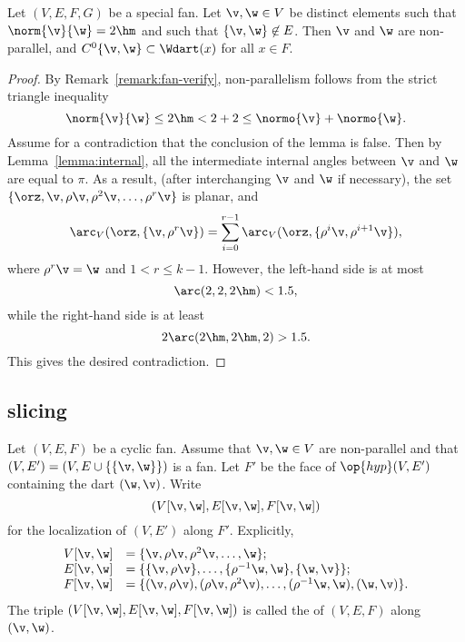 \begin{lemma}\label{lemma:2hm-slice}
Let $(V,E,F,G)$ be a special fan.  Let $\v,\w\in V$ be distinct
elements such that $\norm{\v}{\w}=2\hm$ and such that
$\{\v,\w\}\not\in E$.  Then $\v$ and $\w$ are non-parallel, and
$C^0\{\v,\w\}\subset \Wdart(x)$ for all $x\in F$.
\end{lemma}

\begin{proof} By Remark~\ref{remark:fan-verify}, non-parallelism follows
from the strict triangle inequality
\begin{displaymath}
\norm{\v}{\w} \le 2\hm < 2 + 2 \le \normo{\v} + \normo{\w}.
\end{displaymath}
Assume for a contradiction that the conclusion of the lemma is false.
Then by Lemma~\ref{lemma:internal}, all the intermediate internal
angles between $\v$ and $\w$ are equal to $\pi$.  As a result, (after
interchanging $\v$ and $\w$ if necessary), the set
$\{\orz,\v,\rho\v,\rho^2\v,\ldots,\rho^r\v\}$ is planar, and
\begin{displaymath}
  \arc_V(\orz,\{\v,\rho^r\v\}) 
= \sum_{i=0}^{r-1} \arc_V(\orz,\{\rho^i\v,\rho^{i+1}\v\}),
\end{displaymath}
where $\rho^r \v = \w$ and $1 < r \le k-1$.
However, the left-hand side is at most
\begin{displaymath}
\arc(2,2,2\hm) < 1.5,
\end{displaymath}
while the right-hand side is at least
\begin{displaymath}
2\arc(2\hm,2\hm,2) > 1.5.
\end{displaymath}
This gives the desired contradiction.
\end{proof}

\subsection{slicing}

\begin{definition}[slice] Let $(V,E,F)$ be a cyclic fan.  Assume that
$\v,\w\in V$ are non-parallel and that $(V,E')=(V,E\cup
\{\{\v,\w\}\})$ is a fan.  Let $F'$ be the face of $\op{hyp}(V,E')$
containing the dart $(\w,\v)$.  Write
\begin{displaymath}(V[\v,\w],E[\v,\w],F[\v,\w])\end{displaymath}
for the localization of $(V,E')$ along $F'$.  Explicitly,
\begin{displaymath}
\begin{array}{lll}
  V[\v,\w] &= \{\v,\rho \v,\rho^2 \v,\ldots,\w\};\\
  E[\v,\w] &= \{\{\v,\rho \v\},\ldots,\{\rho^{-1}\w,\w\},\{\w,\v\}\};\\
  F[\v,\w] &= \{(\v,\rho \v),(\rho \v,\rho^2 \v),
 \ldots,(\rho^{-1}\w,\w),(\w,\v)\}.
\end{array}
\end{displaymath}
The triple $(V[\v,\w],E[\v,\w],F[\v,\w])$ is called the
 of $(V,E,F)$ along $(\v,\w)$.
\end{definition}
%

